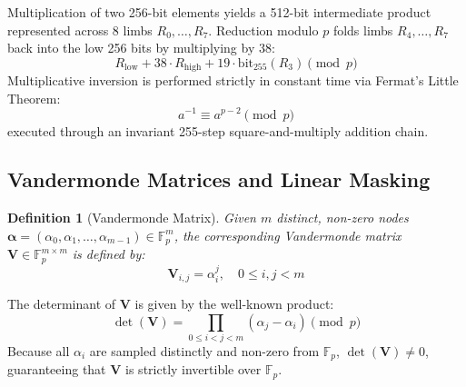 \documentclass[10pt,journal,compsoc]{IEEEtran}
\newtheorem{definition}{Definition}
\begin{document}
Multiplication of two 256-bit elements yields a 512-bit intermediate product represented across 8 limbs $R_0, \dots, R_7$. Reduction modulo $p$ folds limbs $R_4, \dots, R_7$ back into the low 256 bits by multiplying by $38$:
\begin{equation}
\label{eq:reduction}
R_{\text{low}} + 38 \cdot R_{\text{high}} + 19 \cdot \text{bit}_{255}(R_3) \pmod p
\end{equation}
Multiplicative inversion is performed strictly in constant time via Fermat's Little Theorem:
\begin{equation}
a^{-1} \equiv a^{p-2} \pmod p
\end{equation}
executed through an invariant 255-step square-and-multiply addition chain.

\subsection{Vandermonde Matrices and Linear Masking}
\begin{definition}[Vandermonde Matrix]
Given $m$ distinct, non-zero nodes $\boldsymbol{\alpha} = (\alpha_0, \alpha_1, \dots, \alpha_{m-1}) \in \mathbb{F}_p^m$, the corresponding Vandermonde matrix $\mathbf{V} \in \mathbb{F}_p^{m \times m}$ is defined by:
\begin{equation}
\mathbf{V}_{i, j} = \alpha_i^j, \quad 0 \le i, j < m
\end{equation}
\end{definition}

The determinant of $\mathbf{V}$ is given by the well-known product:
\begin{equation}
\det(\mathbf{V}) = \prod_{0 \le i < j < m} (\alpha_j - \alpha_i) \pmod p
\end{equation}
Because all $\alpha_i$ are sampled distinctly and non-zero from $\mathbb{F}_p$, $\det(\mathbf{V}) \ne 0$, guaranteeing that $\mathbf{V}$ is strictly invertible over $\mathbb{F}_p$.
\end{document}
